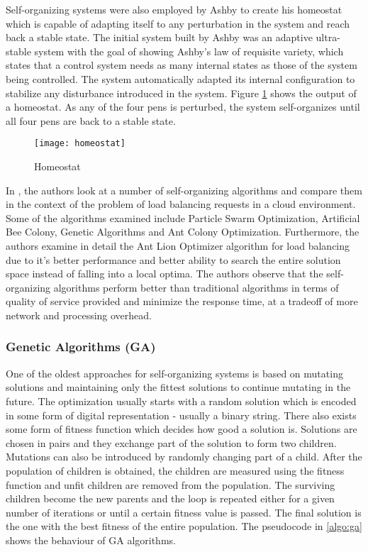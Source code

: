 Self-organizing systems were also employed by Ashby to create his homeostat \cite{ashby:homeostat} which is capable of adapting itself to any perturbation in the system and reach back a stable state. The initial system built by Ashby was an adaptive ultra-stable system with the goal of showing Ashby's law of requisite variety, which states that a control system needs as many internal states as those of the system being controlled. The system automatically adapted its internal configuration to stabilize any disturbance introduced in the system. Figure \ref{fig:homeostat} shows the output of a homeostat. As any of the four pens is perturbed, the system self-organizes until all four pens are back to a stable state.

\begin{figure}
	\centering
		\texttt{[image: homeostat]}
	\caption{Homeostat}
	\label{fig:homeostat}
\end{figure}

In \cite{Intelligent cloud algorithms for load balancing problems: A survey}, the authors look at a number of self-organizing algorithms and compare them in the context of the problem of load balancing requests in a cloud environment. Some of the algorithms examined include Particle Swarm Optimization, Artificial Bee Colony, Genetic Algorithms and Ant Colony Optimization. Furthermore, the authors examine in detail the Ant Lion Optimizer algorithm for load balancing due to it's better performance and better ability to search the entire solution space instead of falling into a local optima. The authors observe that the self-organizing algorithms perform better than traditional algorithms in terms of quality of service provided and minimize the response time, at a tradeoff of more network and processing overhead.

\subsubsection{Genetic Algorithms (GA)}

One of the oldest approaches for self-organizing systems is based on mutating solutions and maintaining only the fittest solutions to continue mutating in the future. The optimization usually starts with a random solution which is encoded in some form of digital representation - usually a binary string. There also exists some form of fitness function which decides how good a solution is. Solutions are chosen in pairs and they exchange part of the solution to form two children. Mutations can also be introduced by randomly changing part of a child. After the population of children is obtained, the children are measured using the fitness function and unfit children are removed from the population. The surviving children become the new parents and the loop is repeated either for a given number of iterations or until a certain fitness value is passed. The final solution is the one with the best fitness of the entire population. The pseudocode in \ref{algo:ga} shows the behaviour of GA algorithms.

